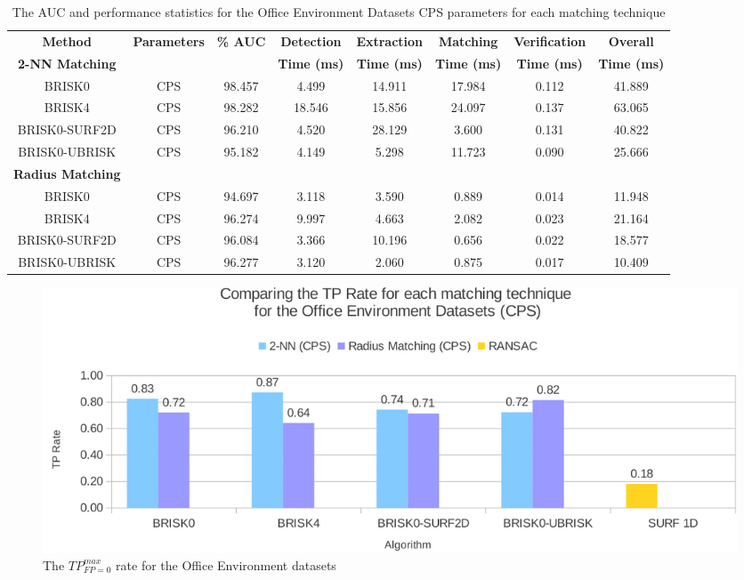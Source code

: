 \documentclass[11pt]{report}
\begin{document}
\begin{table}
\caption{The AUC and performance statistics for the Office Environment Datasets
CPS parameters for each matching technique}

\footnotesize
\begin{tabular}{|c|c|c|c|c|c|c|c|}
\hline 
\textbf{Method } & \textbf{Parameters} & \textbf{\% AUC} & \textbf{Detection} & \textbf{Extraction} & \textbf{Matching} & \textbf{Verification} & \textbf{Overall}\tabularnewline
\textbf{2-NN Matching} &  &  & \textbf{Time (ms)} & \textbf{Time (ms)} & \textbf{Time (ms)} & \textbf{Time (ms)} & \textbf{Time (ms)}\tabularnewline
\hline 
\hline 
BRISK0 & CPS & 98.457 & 4.499 & 14.911 & 17.984 & 0.112 & 41.889\tabularnewline
\hline 
BRISK4 & CPS & 98.282 & 18.546 & 15.856 & 24.097 & 0.137 & 63.065\tabularnewline
\hline 
BRISK0-SURF2D & CPS & 96.210 & 4.520 & 28.129 & 3.600 & 0.131 & 40.822\tabularnewline
\hline 
BRISK0-UBRISK & CPS & 95.182 & 4.149 & 5.298 & 11.723 & 0.090 & 25.666\tabularnewline
\hline 
\textbf{Radius Matching} &  &  &  &  &  &  & \tabularnewline
\hline 
BRISK0 & CPS & 94.697 & 3.118 & 3.590 & 0.889 & 0.014 & 11.948\tabularnewline
\hline 
BRISK4 & CPS & 96.274 & 9.997 & 4.663 & 2.082 & 0.023 & 21.164\tabularnewline
\hline 
BRISK0-SURF2D & CPS & 96.084 & 3.366 & 10.196 & 0.656 & 0.022 & 18.577\tabularnewline
\hline 
BRISK0-UBRISK & CPS & 96.277 & 3.120 & 2.060 & 0.875 & 0.017 & 10.409\tabularnewline
\hline 
\end{tabular}
\label{app:oe_times}
\end{table}

\begin{figure}
  \centering
    \includegraphics[width=1.0\textwidth]{../Drawings/Graphs/tp_rate_oe_cps.pdf}
    \caption{The $TP_{FP=0}^{max}$ rate for the Office Environment datasets} 
    \label{app:tp_rate_oe}
\end{figure}
\end{document}
